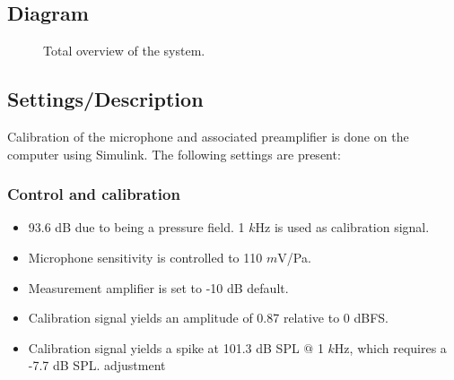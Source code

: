 \subsection{Diagram}


\begin{figure}[H]
	\centering
	
	\caption{Total overview of the system.}
	\label{SchematicOverviewHP}
\end{figure}
\subsection{Settings/Description}
\label{SettingsHeadPhones}
Calibration of the microphone and associated preamplifier is done on the computer using Simulink\textsuperscript{\textregistered}. The following settings are present:

\subsubsection{Control and calibration}
\begin{itemize}
	\item 93.6 dB due to being a pressure field. 1 $k$Hz is used as calibration signal. %
	\item Microphone sensitivity is controlled to 110 $m$V/Pa.
	\item Measurement amplifier is set to -10 dB default.
	\item Calibration signal yields an amplitude of 0.87 relative to 0 dBFS. 
	\item Calibration signal yields a spike at 101.3 dB SPL $@$ 1 $k$Hz, which requires a -7.7 dB SPL. adjustment
\end{itemize}
